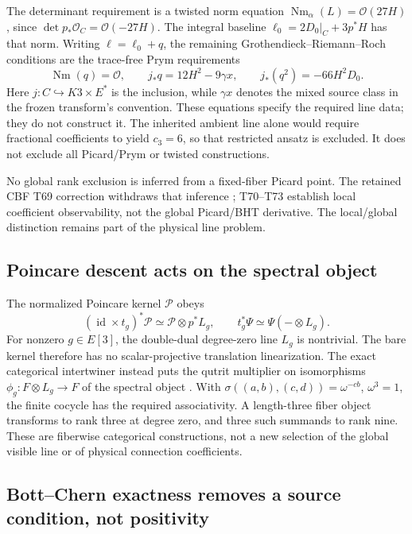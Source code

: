 \documentclass[11pt]{article}
\begin{document}
The determinant requirement is a twisted norm equation
$\operatorname{Nm}_\alpha(L)=\mathcal O(27H)$, since
$\det p_*\mathcal O_C=\mathcal O(-27H)$.
The integral baseline $\ell_0=2D_0|_C+3p^*H$ has that norm. Writing
$\ell=\ell_0+q$, the remaining Grothendieck--Riemann--Roch conditions
are the trace-free Prym requirements
\[
 \operatorname{Nm}(q)=\mathcal O,\qquad
 j_*q=12H^2-9\gamma x,\qquad
 j_*(q^2)=-66H^2D_0.
\]
Here $j:C\hookrightarrow K3\times E^*$ is the inclusion, while
$\gamma x$ denotes the mixed source class in the frozen transform's
convention. These equations specify the required line data; they do not
construct it. The inherited ambient line alone would require fractional
coefficients to yield $c_3=6$, so that restricted ansatz is excluded.
It does not exclude all Picard/Prym or twisted constructions.

No global rank exclusion is inferred from a fixed-fiber Picard point.
The retained CBF T69 correction withdraws that inference \cite{FrozenT69}; T70--T73
establish local coefficient observability, not the global Picard/BHT
derivative. The local/global distinction remains part of the physical
line problem.

\subsection{Poincare descent acts on the spectral object}
\label{sec:poincare-object}

The normalized Poincare kernel $\mathcal P$ obeys
\[
 (\operatorname{id}\times t_g)^*\mathcal P
   \simeq\mathcal P\otimes p^*L_g,
 \qquad t_g^*\Psi\simeq\Psi(-\otimes L_g).
\]
For nonzero $g\in E[3]$, the double-dual degree-zero line $L_g$ is
nontrivial. The bare kernel therefore has no scalar-projective
translation linearization. The exact categorical intertwiner instead
puts the qutrit multiplier on isomorphisms
$\phi_g:F\otimes L_g\to F$ of the spectral object
\cite{FrozenPoincare}. With
$\sigma((a,b),(c,d))=\omega^{-cb}$, $\omega^3=1$, the finite cocycle
has the required associativity. A length-three fiber object transforms
to rank three at degree zero, and three such summands to rank nine.
These are fiberwise categorical constructions, not a new selection of the
global visible line or of physical connection coefficients.

\subsection{Bott--Chern exactness removes a source condition, not positivity}
\label{sec:bott-chern}
\end{document}
